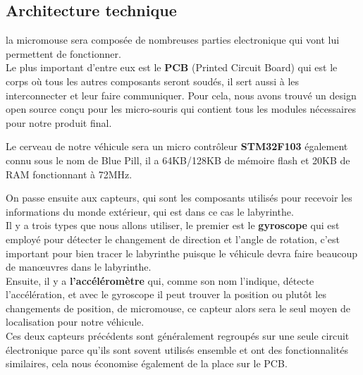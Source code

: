 \subsection{Architecture technique} \label{sec:archTechnique}

   la micromouse sera composée de nombreuses parties electronique qui vont lui
permettent de fonctionner. \\


   Le plus important d'entre eux est le \textbf{PCB} (Printed Circuit Board)
qui est le corps où tous les autres composants seront soudés, il sert aussi
à les interconnecter et  leur faire communiquer. Pour cela, nous avons
trouvé un design open source \cite{Bulebule:1} conçu pour les micro-souris
qui contient tous les modules nécessaires pour notre produit final. \\




   Le cerveau de notre véhicule sera un micro contrôleur \textbf{STM32F103}
\cite{Bluepill:1} également connu sous le nom de Blue Pill, il a 64KB/128KB de
mémoire flash et 20KB de RAM fonctionnant à 72MHz. \\



   On passe ensuite aux capteurs, qui sont les composants utilisés pour
recevoir les informations du monde extérieur, qui est dans ce cas le
labyrinthe. \\


   Il y a trois types que nous allons utiliser, le premier est le
\textbf{gyroscope} qui est employé pour détecter le changement de direction
et l'angle de rotation, c'est important pour bien tracer le labyrinthe
puisque le véhicule devra faire beaucoup de manœuvres dans le labyrinthe. \\


   Ensuite, il y a \textbf{l'accéléromètre} qui, comme son nom l'indique,
détecte l'accélération, et avec le gyroscope il peut trouver la position ou
plutôt les changements de position, de micromouse, ce capteur alors sera le
seul moyen de localisation pour notre véhicule.\\


   Ces deux capteurs précédents sont généralement regroupés sur une seule
circuit électronique parce qu'ils sont sovent utilisés ensemble et ont des
fonctionnalités similaires, cela nous économise également de la place sur le
PCB. \\


